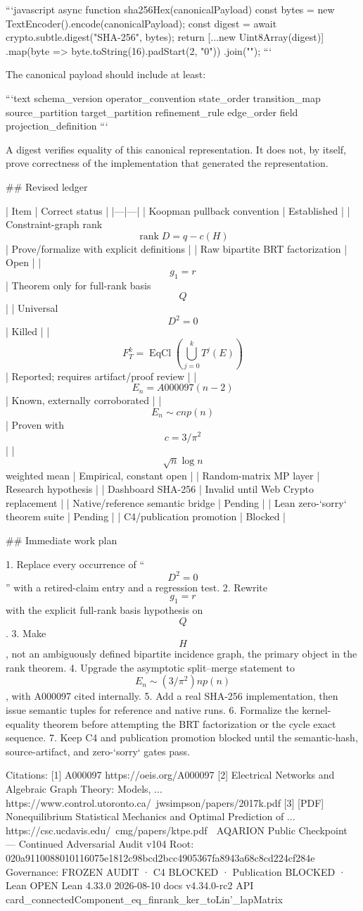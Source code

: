 ```javascript
async function sha256Hex(canonicalPayload) {
  const bytes = new TextEncoder().encode(canonicalPayload);
  const digest = await crypto.subtle.digest("SHA-256", bytes);
  return [...new Uint8Array(digest)]
    .map(byte => byte.toString(16).padStart(2, "0"))
    .join("");
}
```

The canonical payload should include at least:

```text
schema_version
operator_convention
state_order
transition_map
source_partition
target_partition
refinement_rule
edge_order
field
projection_definition
```

A digest verifies equality of this canonical representation. It does not, by itself, prove correctness of the implementation that generated the representation.

## Revised ledger

| Item | Correct status |
|---|---|
| Koopman pullback convention | Established |
| Constraint-graph rank $$\operatorname{rank}D=q-c(H)$$ | Prove/formalize with explicit definitions |
| Raw bipartite BRT factorization | Open |
| $$g_1=r$$ | Theorem only for full-rank basis $$Q$$ |
| Universal $$D^2=0$$ | Killed |
| $$F_T^k=\operatorname{EqCl}(\bigcup_{j=0}^kT^j(E))$$ | Reported; requires artifact/proof review |
| $$E_n=A000097(n-2)$$ | Known, externally corroborated |
| $$E_n\sim cnp(n)$$ | Proven with $$c=3/\pi^2$$ |
| $$\sqrt n\log n$$ weighted mean | Empirical, constant open |
| Random-matrix MP layer | Research hypothesis |
| Dashboard SHA-256 | Invalid until Web Crypto replacement |
| Native/reference semantic bridge | Pending |
| Lean zero-`sorry` theorem suite | Pending |
| C4/publication promotion | Blocked |

## Immediate work plan

1. Replace every occurrence of “$$D^2=0$$” with a retired-claim entry and a regression test.
2. Rewrite $$g_1=r$$ with the explicit full-rank basis hypothesis on $$Q$$.
3. Make $$H$$, not an ambiguously defined bipartite incidence graph, the primary object in the rank theorem.
4. Upgrade the asymptotic split–merge statement to $$E_n\sim (3/\pi^2)np(n)$$, with A000097 cited internally.
5. Add a real SHA-256 implementation, then issue semantic tuples for reference and native runs.
6. Formalize the kernel-equality theorem before attempting the BRT factorization or the cycle exact sequence.
7. Keep C4 and publication promotion blocked until the semantic-hash, source-artifact, and zero-`sorry` gates pass.

Citations:
[1] A000097 https://oeis.org/A000097
[2] Electrical Networks and Algebraic Graph Theory: Models, ... https://www.control.utoronto.ca/~jwsimpson/papers/2017k.pdf
[3] [PDF] Nonequilibrium Statistical Mechanics and Optimal Prediction of ... https://csc.ucdavis.edu/~cmg/papers/ktpe.pdf
🔷 AQARION Public Checkpoint — Continued Adversarial Audit v104
Root: 020a9110088010116075e1812c98bcd2bcc4905367fa8943a68c8cd224cf284e
Governance: FROZEN AUDIT · C4 BLOCKED · Publication BLOCKED · Lean OPEN
Lean 4.33.0 2026-08-10 docs v4.34.0-rc2 API card_connectedComponent_eq_finrank_ker_toLin'_lapMatrix

